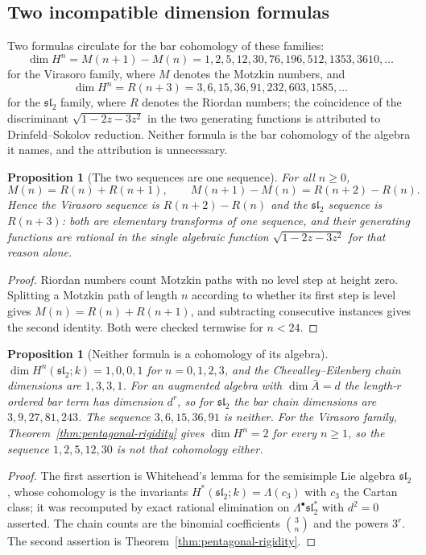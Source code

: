 \documentclass[11pt,reqno]{amsart}
\newtheorem{proposition}[theorem]{Proposition}
\theoremstyle{definition}
\theoremstyle{remark}
\begin{document}
\subsection{Two incompatible dimension formulas}

Two formulas circulate for the bar cohomology of these families:
\[
  \dim H^n = M(n+1)-M(n) = 1,2,5,12,30,76,196,512,1353,3610,\dots
\]
for the Virasoro family, where $M$ denotes the Motzkin numbers, and
\[
  \dim H^n = R(n+3) = 3,6,15,36,91,232,603,1585,\dots
\]
for the $\mathfrak{sl}_2$ family, where $R$ denotes the Riordan numbers;
the coincidence of the discriminant $\sqrt{1-2z-3z^2}$ in the two
generating functions is attributed to Drinfeld--Sokolov reduction.
Neither formula is the bar cohomology of the algebra it names, and the
attribution is unnecessary.

\begin{proposition}[The two sequences are one sequence]
\label{prop:one-sequence}
For all $n\ge0$,
\[
  M(n) = R(n)+R(n+1),
  \qquad
  M(n+1)-M(n) = R(n+2)-R(n).
\]
Hence the Virasoro sequence is $R(n+2)-R(n)$ and the $\mathfrak{sl}_2$
sequence is $R(n+3)$: both are elementary transforms of one sequence, and
their generating functions are rational in the single algebraic function
$\sqrt{1-2z-3z^2}$ for that reason alone.
\end{proposition}

\begin{proof}
Riordan numbers count Motzkin paths with no level step at height zero.
Splitting a Motzkin path of length $n$ according to whether its first
step is level gives $M(n)=R(n)+R(n+1)$, and subtracting consecutive
instances gives the second identity. Both were checked termwise for
$n<24$.
\end{proof}

\begin{proposition}[Neither formula is a cohomology of its algebra]
\label{prop:not-cohomology}
$\dim H^n(\mathfrak{sl}_2;k) = 1,0,0,1$ for $n=0,1,2,3$, and the
Chevalley--Eilenberg chain dimensions are $1,3,3,1$. For an augmented
algebra with $\dim\bar A = d$ the length-$r$ ordered bar term has
dimension $d^r$, so for $\mathfrak{sl}_2$ the bar chain dimensions are
$3,9,27,81,243$. The sequence $3,6,15,36,91$ is neither. For the Virasoro
family, Theorem~\ref{thm:pentagonal-rigidity} gives $\dim H^n = 2$ for
every $n\ge1$, so the sequence $1,2,5,12,30$ is not that cohomology
either.
\end{proposition}

\begin{proof}
The first assertion is Whitehead's lemma for the semisimple Lie algebra
$\mathfrak{sl}_2$, whose cohomology is the invariants
$H^*(\mathfrak{sl}_2;k)=\Lambda(c_3)$ with $c_3$ the Cartan class; it was
recomputed by exact rational elimination on $\Lambda^\bullet
\mathfrak{sl}_2^*$ with $d^2=0$ asserted. The chain counts are the
binomial coefficients $\binom{3}{n}$ and the powers $3^r$. The second
assertion is Theorem~\ref{thm:pentagonal-rigidity}.
\end{proof}
\end{document}
